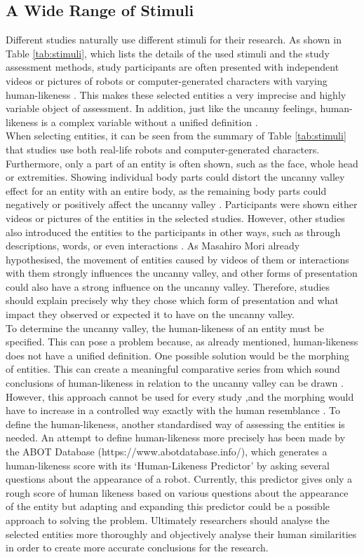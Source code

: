 \subsection{A Wide Range of Stimuli}
Different studies naturally use different stimuli for their research. As shown in Table \ref{tab:stimuli}, which lists the details of the used stimuli and the study assessment methods, study participants are often presented with independent videos or pictures of robots or computer-generated characters with varying human-likeness \cite{quant_review}. This makes these selected entities a very imprecise and highly variable object of assessment. In addition, just like the uncanny feelings, human-likeness is a complex variable without a unified definition \cite{quant_review}.\\
When selecting entities, it can be seen from the summary of Table \ref{tab:stimuli} that studies use both real-life robots and computer-generated characters. Furthermore, only a part of an entity is often shown, such as the face, whole head or extremities. Showing individual body parts could distort the uncanny valley effect for an entity with an entire body, as the remaining body parts could negatively or positively affect the uncanny valley \cite{quant_review}. Participants were shown either videos or pictures of the entities in the selected studies. However, other studies also introduced the entities to the participants in other ways, such as through descriptions, words, or even interactions \cite{quant_review}. As Masahiro Mori \cite{original_masahiro} already hypothesised, the movement of entities caused by videos of them or interactions with them strongly influences the uncanny valley, and other forms of presentation could also have a strong influence on the uncanny valley. Therefore, studies should explain precisely why they chose which form of presentation and what impact they observed or expected it to have on the uncanny valley.\\
To determine the uncanny valley, the human-likeness of an entity must be specified. This can pose a problem because, as already mentioned, human-likeness does not have a unified definition.
One possible solution would be the morphing of entities. This can create a meaningful comparative series from which sound conclusions of human-likeness in relation to the uncanny valley can be drawn \cite{quant_review}. However, this approach cannot be used for every study ,and the morphing would have to increase in a controlled way exactly with the human resemblance \cite{quant_review}.
To define the human-likeness, another standardised way of assessing the entities is needed.
An attempt to define human-likeness more precisely has been made by the ABOT Database (https://www.abotdatabase.info/), which generates a human-likeness score with its `Human-Likeness Predictor' by asking several questions about the appearance of a robot.
Currently, this predictor gives only a rough score of human likeness based on various questions about the appearance of the entity but adapting and expanding this predictor could be a possible approach to solving the problem. Ultimately researchers should analyse the selected entities more thoroughly and objectively analyse their human similarities in order to create more accurate conclusions for the research.

